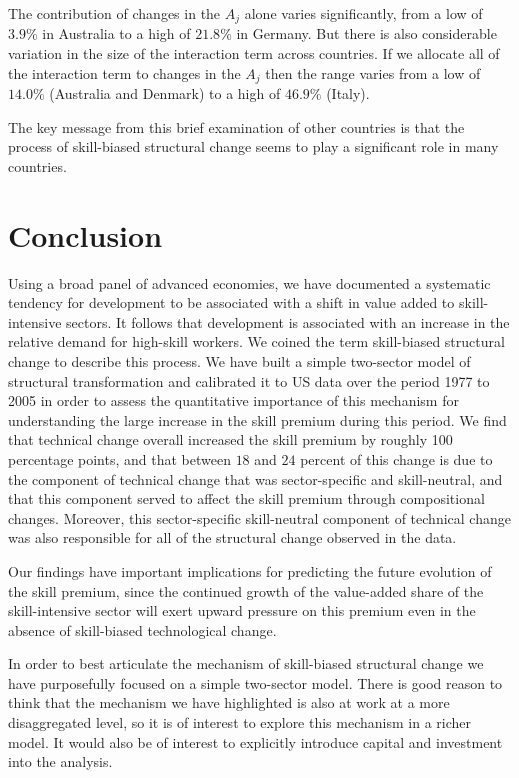 \documentclass[12pt,english]{article}
\begin{document}
{\normalsize The contribution of changes in the $A_{j}$ alone varies
significantly, from a low of $3.9\%$ in Australia to a high of $21.8\%$ in
Germany. But there is also considerable variation in the size of the
interaction term across countries. If we allocate all of the interaction
term to changes in the $A_{j}$ then the range varies from a low of $14.0\%$
(Australia and Denmark) to a high of $46.9\%$ (Italy). }

{\normalsize The key message from this brief examination of other countries
is that the process of skill-biased structural change seems to play a
significant role in many countries. }

\section{Conclusion}

{\normalsize Using a broad panel of advanced economies, we have documented a
systematic tendency for development to be associated with a shift in value
added to skill-intensive sectors. It follows that development is associated
with an increase in the relative demand for high-skill workers. We coined
the term skill-biased structural change to describe this process. We have
built a simple two-sector model of structural transformation and calibrated
it to US data over the period 1977 to 2005 in order to assess the
quantitative importance of this mechanism for understanding the large
increase in the skill premium during this period. We find that technical
change overall increased the skill premium by roughly 100 percentage points,
and that between $18$ and $24$ percent of this change is due to the
component of technical change that was sector-specific and skill-neutral,
and that this component served to affect the skill premium through
compositional changes. Moreover, this sector-specific skill-neutral
component of technical change was also responsible for all of the structural
change observed in the data. }

{\normalsize Our findings have important implications for predicting the
future evolution of the skill premium, since the continued growth of the
value-added share of the skill-intensive sector will exert upward pressure
on this premium even in the absence of skill-biased technological change. }

{\normalsize In order to best articulate the mechanism of skill-biased
structural change we have purposefully focused on a simple two-sector model.
There is good reason to think that the mechanism we have highlighted is also
at work at a more disaggregated level, so it is of interest to explore this
mechanism in a richer model. It would also be of interest to explicitly introduce capital and investment into the analysis.}
\end{document}
